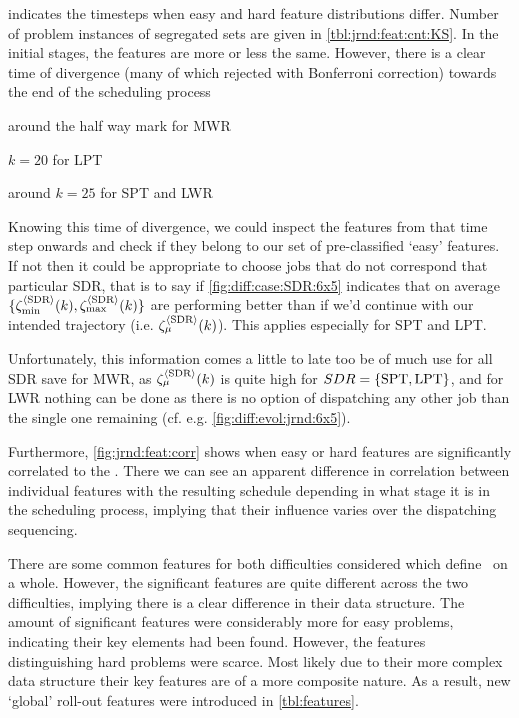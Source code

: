  indicates the timesteps when easy and hard feature 
distributions differ. Number of problem instances of segregated sets are given 
in \cref{tbl:jrnd:feat:cnt:KS}. 
In the initial stages, the features are more or less the same. 
However, there is a clear time of divergence (many of which rejected with 
Bonferroni correction) towards the end of the scheduling process
\begin{enumerate*}
    \item around the half way mark for MWR
    \item $k=20$ for LPT
    \item around $k=25$ for SPT and LWR
\end{enumerate*}
Knowing this time of divergence, we could inspect the features from that time 
step onwards and check if they belong to our set of pre-classified `easy' 
features. If not then it could be appropriate to choose jobs that do not 
correspond that particular SDR, that is to say if \cref{fig:diff:case:SDR:6x5} 
indicates that on average $\{\zeta_{\min}^{\langle \text{SDR} \rangle}(k),\zeta_{\max}^{\langle \text{SDR} \rangle}(k)\}$ 
are performing better than if we'd continue with our intended trajectory (i.e. 
$\zeta_{\mu}^{\langle \text{SDR} \rangle}(k)$). This applies especially for SPT and LPT.

Unfortunately, this information comes a little to late too be of much use for 
all SDR save for MWR, as $\zeta_{\mu}^{\langle \text{SDR} \rangle}(k)$ is quite high for 
$SDR=\{\text{SPT},\text{LPT}\}$, and for LWR nothing can be done as there is no option of 
dispatching any other job than the single one remaining (cf. e.g. 
\cref{fig:diff:evol:jrnd:6x5}).

Furthermore, \cref{fig:jrnd:feat:corr} shows when easy or hard features 
are significantly correlated to the \namerho.
There we can see an apparent difference in correlation between individual 
features with the resulting schedule depending in what stage it is in the 
scheduling process, implying that their influence varies over the dispatching 
sequencing. 

There are some common features for both difficulties considered which define 
\jsp\ on a whole. However, the significant features are quite different across 
the two difficulties, implying there is a clear difference in their data 
structure. 
The amount of significant features were considerably more for easy 
problems, indicating their key elements had been found. However, the features 
distinguishing hard problems were scarce. Most likely due to their more complex 
data structure their key features are of a more composite nature. As a result, 
new `global' roll-out features were introduced in \cref{tbl:features}. 

